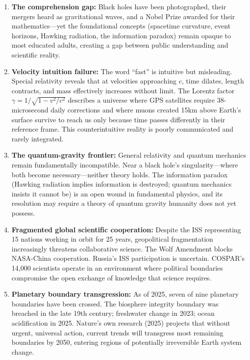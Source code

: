 \documentclass[11pt,letterpaper]{article}
\begin{document}
\begin{enumerate}[leftmargin=*]
\item \textbf{The comprehension gap:} Black holes have been photographed, their mergers heard as gravitational waves, and a Nobel Prize awarded for their mathematics---yet the foundational concepts (spacetime curvature, event horizons, Hawking radiation, the information paradox) remain opaque to most educated adults, creating a gap between public understanding and scientific reality.

\item \textbf{Velocity intuition failure:} The word ``fast'' is intuitive but misleading. Special relativity reveals that at velocities approaching $c$, time dilates, length contracts, and mass effectively increases without limit. The Lorentz factor $\gamma = 1/\sqrt{1-v^2/c^2}$ describes a universe where GPS satellites require 38-microsecond daily corrections and where muons created 15km above Earth's surface survive to reach us only because time passes differently in their reference frame. This counterintuitive reality is poorly communicated and rarely integrated.

\item \textbf{The quantum-gravity frontier:} General relativity and quantum mechanics remain fundamentally incompatible. Near a black hole's singularity---where both become necessary---neither theory holds. The information paradox (Hawking radiation implies information is destroyed; quantum mechanics insists it cannot be) is an open wound in fundamental physics, and its resolution may require a theory of quantum gravity humanity does not yet possess.

\item \textbf{Fragmented global scientific cooperation:} Despite the ISS representing 15 nations working in orbit for 25 years, geopolitical fragmentation increasingly threatens collaborative science. The Wolf Amendment blocks NASA-China cooperation. Russia's ISS participation is uncertain. COSPAR's 14,000 scientists operate in an environment where political boundaries compromise the open exchange of knowledge that science requires.

\item \textbf{Planetary boundary transgression:} As of 2025, seven of nine planetary boundaries have been crossed. The biosphere integrity boundary was breached in the late 19th century; freshwater change in 2023; ocean acidification in 2025. Nature's own research (2025) projects that without urgent, universal action, current trends will transgress most remaining boundaries by 2050, entering regions of potentially irreversible Earth system change.
\end{enumerate}
\end{document}
